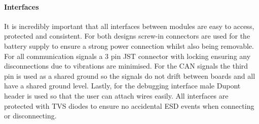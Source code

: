 \paragraph{Interfaces}
It is incredibly important that all interfaces between modules are easy to access, protected and consistent. For both designs screw-in connectors are used for the battery supply to ensure a strong power connection whilst also being removable. For all communication signals a 3 pin JST connector with locking ensuring any disconnections due to vibrations are minimised. For the \gls{CAN} signals the third pin is used as a shared ground so the signals do not drift between boards and all have a shared ground level. Lastly, for the debugging interface male Dupont header is used so that the user can attach wires easily. All interfaces are protected with \gls{TVS} diodes to ensure no accidental \gls{ESD} events when connecting or disconnecting. 